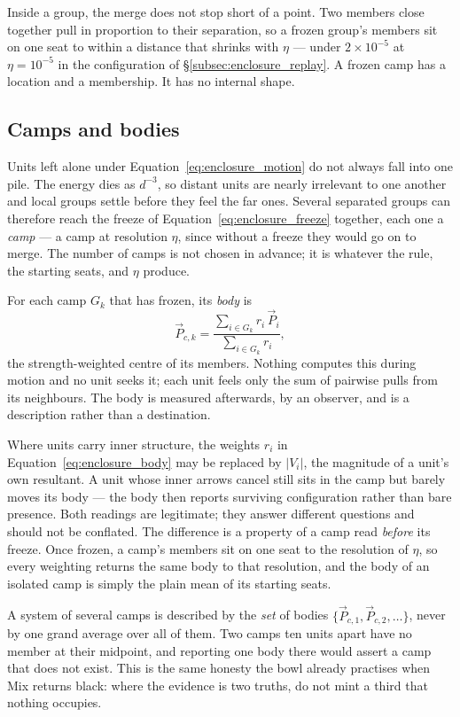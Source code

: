 \documentclass[12pt, a4paper]{article}
\begin{document}
Inside a group, the merge does not stop short of a point. Two
members close together pull in proportion to their separation, so a
frozen group's members sit on one seat to within a distance that
shrinks with $\eta$ --- under $2\times10^{-5}$ at $\eta=10^{-5}$ in
the configuration of \S\ref{subsec:enclosure_replay}. A frozen camp
has a location and a membership. It has no internal shape.

\subsection{Camps and bodies}
\label{subsec:enclosure_camps}
Units left alone under Equation~\eqref{eq:enclosure_motion} do not
always fall into one pile. The energy dies as $d^{-3}$, so distant
units are nearly irrelevant to one another and local groups settle
before they feel the far ones. Several separated groups can
therefore reach the freeze of Equation~\eqref{eq:enclosure_freeze}
together, each one a \emph{camp} --- a camp at resolution $\eta$,
since without a freeze they would go on to merge. The number of
camps is not chosen in advance; it is whatever the rule, the starting seats, and $\eta$ produce.

For each camp $G_k$ that has frozen, its \emph{body} is
\begin{equation}
    \vec P_{c,k}
    = \frac{\sum_{i\in G_k} r_i\,\vec P_i}{\sum_{i\in G_k} r_i},
    \label{eq:enclosure_body}
\end{equation}
the strength-weighted centre of its members. Nothing computes this
during motion and no unit seeks it; each unit feels only the sum of
pairwise pulls from its neighbours. The body is measured afterwards,
by an observer, and is a description rather than a destination.

Where units carry inner structure, the weights $r_i$ in
Equation~\eqref{eq:enclosure_body} may be replaced by
$\lvert V_i\rvert$, the magnitude of a unit's own resultant. A unit
whose inner arrows cancel still sits in the camp but barely moves its
body --- the body then reports surviving configuration rather than
bare presence. Both readings are legitimate; they answer different
questions and should not be conflated. The difference is a property
of a camp read \emph{before} its freeze. Once frozen, a camp's
members sit on one seat to the resolution of $\eta$, so every
weighting returns the same body to that resolution, and the body of
an isolated camp is simply the plain mean of its starting seats.

A system of several camps is described by the \emph{set} of bodies
$\{\vec P_{c,1},\vec P_{c,2},\ldots\}$, never by one grand average
over all of them. Two camps ten units apart have no member at their
midpoint, and reporting one body there would assert a camp that does
not exist. This is the same honesty the bowl already practises when
Mix returns black: where the evidence is two truths, do not mint a
third that nothing occupies.
\end{document}
